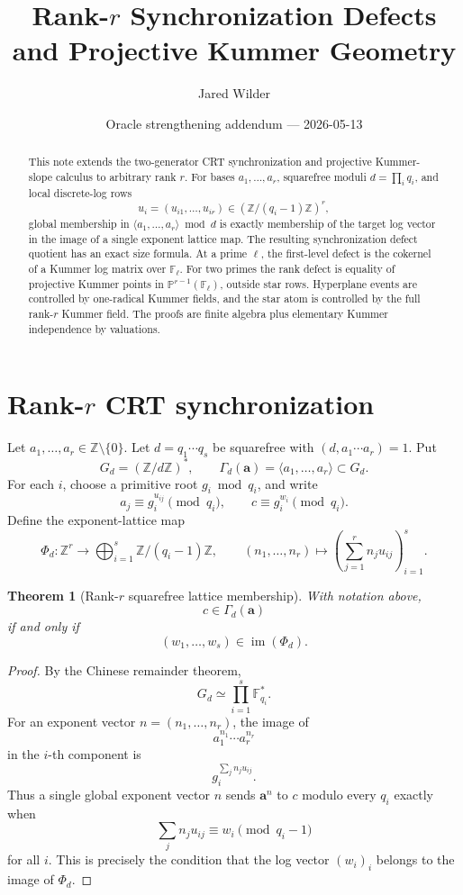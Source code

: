 \documentclass[11pt]{article}
\title{Rank-\(r\) Synchronization Defects and Projective Kummer Geometry}
\author{Jared Wilder}
\date{Oracle strengthening addendum --- 2026-05-13}
\newtheorem{theorem}{Theorem}
\newcommand{\Z}{\mathbb Z}
\newcommand{\F}{\mathbb F}
\newcommand{\Pj}{\mathbb P}
\newcommand{\im}{\operatorname{im}}
\begin{document}
\maketitle

\begin{abstract}
This note extends the two-generator CRT synchronization and projective Kummer-slope calculus to arbitrary rank \(r\).  For bases \(a_1,\ldots,a_r\), squarefree moduli \(d=\prod_i q_i\), and local discrete-log rows
\[
u_i=(u_{i1},\ldots,u_{ir})\in(\Z/(q_i-1)\Z)^r,
\]
global membership in \(\langle a_1,\ldots,a_r\rangle\bmod d\) is exactly membership of the target log vector in the image of a single exponent lattice map.  The resulting synchronization defect quotient has an exact size formula.  At a prime \(\ell\), the first-level defect is the cokernel of a Kummer log matrix over \(\F_\ell\).  For two primes the rank defect is equality of projective Kummer points in \(\Pj^{r-1}(\F_\ell)\), outside star rows.  Hyperplane events are controlled by one-radical Kummer fields, and the star atom is controlled by the full rank-\(r\) Kummer field.  The proofs are finite algebra plus elementary Kummer independence by valuations.
\end{abstract}

\section{Rank-\(r\) CRT synchronization}

Let \(a_1,\ldots,a_r\in\Z\setminus\{0\}\).  Let \(d=q_1\cdots q_s\) be squarefree with \((d,a_1\cdots a_r)=1\).  Put
\[
G_d=(\Z/d\Z)^*,
\qquad
\Gamma_d(\mathbf a)=\langle a_1,\ldots,a_r\rangle\subset G_d.
\]
For each \(i\), choose a primitive root \(g_i\bmod q_i\), and write
\[
a_j\equiv g_i^{u_{ij}}\pmod{q_i},
\qquad
c\equiv g_i^{w_i}\pmod{q_i}.
\]
Define the exponent-lattice map
\[
\Phi_d:\Z^r\longrightarrow \bigoplus_{i=1}^s \Z/(q_i-1)\Z,
\qquad
(n_1,\ldots,n_r)\longmapsto
\left(\sum_{j=1}^r n_j u_{ij}\right)_{i=1}^s .
\]

\begin{theorem}[Rank-\(r\) squarefree lattice membership]\label{T:rankr-membership}
With notation above,
\[
c\in\Gamma_d(\mathbf a)
\]
if and only if
\[
(w_1,\ldots,w_s)\in \im(\Phi_d).
\]
\end{theorem}

\begin{proof}
By the Chinese remainder theorem,
\[
G_d\simeq\prod_{i=1}^s\F_{q_i}^*.
\]
For an exponent vector \(n=(n_1,\ldots,n_r)\), the image of
\[
a_1^{n_1}\cdots a_r^{n_r}
\]
in the \(i\)-th component is
\[
g_i^{\sum_j n_j u_{ij}}.
\]
Thus a single global exponent vector \(n\) sends \(\mathbf a^n\) to \(c\) modulo every \(q_i\) exactly when
\[
\sum_j n_j u_{ij}\equiv w_i\pmod{q_i-1}
\]
for all \(i\).  This is precisely the condition that the log vector \((w_i)_i\) belongs to the image of \(\Phi_d\).
\end{proof}
\end{document}
